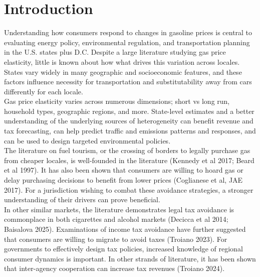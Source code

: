 \documentclass[12pt,a4paper]{article}
\begin{document}
\section{Introduction} 
Understanding how consumers respond to changes in gasoline prices is central to evaluating energy policy, environmental regulation, and transportation planning in the U.S. states plus D.C. Despite a large literature studying gas price elasticity, little is known about how what drives this variation across locales. States vary widely in many geographic and socioeconomic features, and these factors influence necessity for transportation and substitutability away from cars differently for each locale. \\ 

Gas price elasticity varies across numerous dimensions; short vs long run, household types, geographic regions, and more. State-level estimates and a better understanding of the underlying sources of heterogeneity can benefit revenue and tax forecasting, can help predict traffic and emissions patterns and responses, and can be used to design targeted environmental policies. \\

The literature on fuel tourism, or the crossing of borders to legally purchase gas from cheaper locales, is well-founded in the literature (Kennedy et al 2017; Beard et al 1997). It has also been shown that consumers are willing to hoard gas or delay purchasing decisions to benefit from lower prices (Coglianese et al, JAE 2017). For a jurisdiction wishing to combat these avoidance strategies, a stronger understanding of their drivers can prove beneficial. \\

In other similar markets, the literature demonstrates legal tax avoidance is commonplace in both cigarettes and alcohol markets (Decicca et al 2014; Baisalova 2025). Examinations of income tax avoidance have further suggested that consumers are willing to migrate to avoid taxes (Troiano 2023). For governments to effectively design tax policies, increased knowledge of regional consumer dynamics is important. In other strands of literature, it has been shown that inter-agency cooperation can increase tax revenues (Troiano 2024). \\
\end{document}
